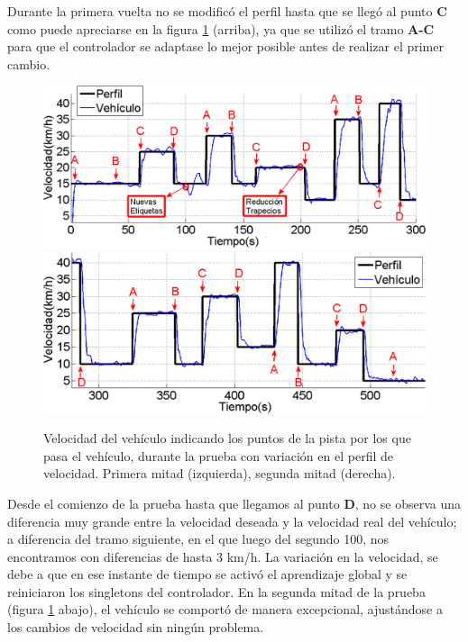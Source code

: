 
Durante la primera vuelta no se modificó el perfil hasta que se llegó al punto \textbf{C} como puede apreciarse en la figura \ref{fig:v1} (arriba), ya que se utilizó el tramo \textbf{A-C} para que el controlador se adaptase lo mejor posible antes de realizar el primer cambio.

\begin{figure}[htb]
\centering
\includegraphics[width=0.65\linewidth]{figures/p61.png}
\includegraphics[width=0.65\linewidth] {figures/p62.png}
\caption{Velocidad del vehículo indicando los puntos de la pista por los que pasa el vehículo, durante la prueba con variación en el perfil de velocidad. Primera mitad (izquierda), segunda mitad (derecha).}
\label{fig:v1}
\end{figure}

Desde el comienzo de la prueba hasta que llegamos al punto \textbf{D}, no se observa una diferencia muy grande entre la velocidad deseada y la velocidad real del vehículo; a diferencia del tramo siguiente, en el que luego del segundo 100, nos encontramos con diferencias de hasta 3 km/h. La variación en la velocidad, se debe a que en ese instante de tiempo se activó el aprendizaje global y se reiniciaron los singletons del controlador. En la segunda mitad de la prueba (figura \ref{fig:v1} abajo), el vehículo se comportó de manera excepcional, ajustándose a los cambios de velocidad sin ningún problema.

